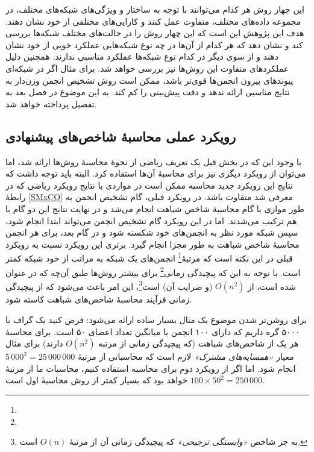 این چهار روش هر کدام می‌توانند با توجه به ساختار و ویژگی‌های شبکه‌های مختلف، در مجموعه داده‌های مختلف، متفاوت عمل کنند و کارایی‌های مختلفی از خود نشان دهند. هدف این پژوهش این است که این چهار روش را در حالت‌های مختلف شبکه‌ها بررسی کند و نشان دهد که هر کدام از آن‌ها در چه نوع شبکه‌هایی عملکرد خوبی از خود نشان دهند و از سوی دیگر در کدام نوع شبکه‌ها عملکرد مناسبی ندارند. همچنین دلیل عملکردهای متفاوت این روش‌ها نیز بررسی خواهد شد. برای مثال اگر در شبکه‌ای پیوند‌های بیرون انجمن‌ها قوی‌تر باشد، ممکن است روش تشخیص انجمن وزن‌دار به نتایج مناسبی ارائه ندهد و دقت پیش‌بینی را کم کند. به این موضوع در فصل بعد به تفصیل پرداخته خواهد شد.


\subsection{رویکرد عملی محاسبهٔ شاخص‌های پیشنهادی}\label{subsec:practical}
با وجود این که در بخش قبل یک تعریف ریاضی از نحوهٔ محاسبهٔ روش‌ها ارائه شد، اما می‌توان از رویکرد دیگری نیز برای محاسبهٔ آن‌ها استفاده کرد. البته باید توجه داشت که نتایج این رویکرد جدید محاسبه ممکن است در مواردی با نتایج رویکرد ریاضی که در رابطهٔ \ref{SMxCO} معرفی شد متفاوت باشد. در رویکرد قبلی، گام تشخیص انجمن به طور موازی با گام محاسبهٔ شاخص شباهت انجام می‌شد و در نهایت نتایج این دو گام با هم ترکیب می‌شدند. اما در این رویکرد گام تشخیص انجمن می‌تواند ابتدا انجام شود، سپس شبکه مورد نظر به انجمن‌های خود شکسته شود و در گام بعد، برای هر انجمن محاسبهٔ شاخص شباهت به طور مجزا انجام گیرد. برتری این رویکرد نسبت به رویکرد قبلی در این نکته است که مرتبهٔ\footnote{} انجمن‌های یک شبکه به مراتب از خود شبکه کمتر است. با توجه به این که پیچیدگی زمانی\footnote{} برای بیشتر روش‌ها طبق آن‌چه که در \cite{wang2015link} عنوان شده است، از $O(n^2)$ (و ضرایب آن) است\footnote{به جز شاخص \textit{«وابستگی ترجیحی»} که پیچیدگی زمانی آن از مرتبهٔ $O(n)$ است.}، این امر باعث می‌شود که از پیچیدگی زمانی فرآیند محاسبهٔ شاخص‌های شباهت کاسته شود.

برای روشن‌تر شدن موضوع یک مثال بسیار ساده ارائه می‌شود: فرض کنید یک گراف با ۵۰۰۰ گره داریم که دارای ۱۰۰ انجمن با میانگین تعداد اعضای ۵۰ است. برای محاسبهٔ هر یک از شاخص‌های شباهت (که پیچیدگی زمانی از مرتبه $O(n^2)$ دارند) برای مثال معیار \textit{«همسایه‌های مشترک»} لازم است که محاسباتی از مرتبهٔ
$5\,000^2 = 25\,000\,000$
انجام شود. اما اگر از رویکرد دوم برای محاسبه استفاده کنیم، محاسبات ما از مرتبهٔ
$100 \times 50^2 = 250\,000$
خواهد بود که بسیار کمتر از روش محاسبه‌‌ٔ اول است.

